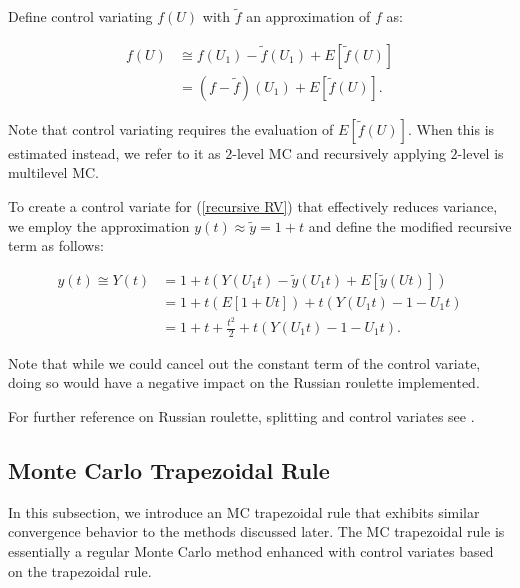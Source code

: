 \documentclass[a4paper,12pt]{article}
\begin{document}
\begin{definition} \label{CV}
  Define control variating $f(U)$ with $\tilde{f}$ an approximation of $f$ as:

  \begin{align}
    f(U) & \cong f(U_{1})-\tilde{f}(U_{1}) + E[\tilde{f}(U)] \\
         & = (f-\tilde{f})(U_{1}) + E[\tilde{f}(U)]
    .
  \end{align}

  Note that control variating requires the evaluation of
  $E[\tilde{f}(U)]$.  When this is estimated instead, we refer to it as $2$-level MC
  and recursively applying $2$-level is multilevel MC.
\end{definition}


\begin{example} \label{ex:CV}
  To create a control variate for (\ref{recursive RV}) that
  effectively reduces variance, we employ the approximation
  $y(t) \approx \tilde{y} =1+t$ and define the modified recursive term as follows:

  \begin{align}
    y(t) \cong Y(t) & = 1 + t(Y(U_{1}t) - \tilde{y}(U_{1}t) + E[\tilde{y}(Ut)])     \\
                    & = 1 + t \left( E[1 + Ut]  \right) + t(Y(U_{1}t) - 1 - U_{1}t) \\
                    & = 1 + t + \frac{t^2}{2} + t(Y(U_{1}t) - 1 - U_{1}t).
  \end{align}

  Note that while we could cancel out the constant term
  of the control variate, doing so would have a negative impact
  on the Russian roulette implemented.
\end{example}

\begin{related}[MC modification]
  For further reference on Russian roulette, splitting and control variates
  see \cite{veach_robust_1997}.
\end{related}

\subsection{Monte Carlo Trapezoidal Rule}

In this subsection, we introduce an MC trapezoidal rule that
exhibits similar convergence behavior to the methods discussed later.
The MC trapezoidal rule is essentially a regular Monte Carlo method
enhanced with control variates based on the trapezoidal rule.
\end{document}
